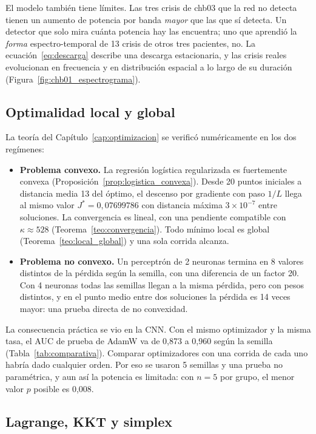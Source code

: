 El modelo también tiene límites. Las tres crisis de chb03 que la red no detecta tienen un aumento de potencia por banda
\emph{mayor} que las que sí detecta. Un detector que solo mira cuánta potencia hay las encuentra; uno que aprendió la
\emph{forma} espectro-temporal de 13 crisis de otros tres pacientes, no. La ecuación~\eqref{eq:descarga} describe una
descarga estacionaria, y las crisis reales evolucionan en frecuencia y en distribución espacial a lo largo de su duración
(Figura~\ref{fig:chb01_espectrograma}).

\subsection{Optimalidad local y global}

La teoría del Capítulo~\ref{cap:optimizacion} se verificó numéricamente en los dos regímenes:
\begin{itemize}
  \item \textbf{Problema convexo.} La regresión logística regularizada es fuertemente convexa
        (Proposición~\ref{prop:logistica_convexa}). Desde 20 puntos iniciales a distancia media 13 del óptimo, el descenso por
        gradiente con paso $1/L$ llega al mismo valor $J^* = 0{,}07699786$ con distancia máxima $3\times10^{-7}$ entre
        soluciones. La convergencia es lineal, con una pendiente compatible con $\kappa \approx 528$
        (Teorema~\ref{teo:convergencia}). Todo mínimo local es global (Teorema~\ref{teo:local_global}) y una sola corrida
        alcanza.
  \item \textbf{Problema no convexo.} Un perceptrón de 2 neuronas termina en 8 valores distintos de la pérdida según la
        semilla, con una diferencia de un factor 20. Con 4 neuronas todas las semillas llegan a la misma pérdida, pero con
        pesos distintos, y en el punto medio entre dos soluciones la pérdida es 14 veces mayor: una prueba directa de no
        convexidad.
\end{itemize}

La consecuencia práctica se vio en la CNN. Con el mismo optimizador y la misma tasa, el AUC de prueba de AdamW va de 0,873
a 0,960 según la semilla (Tabla~\ref{tab:comparativa}). Comparar optimizadores con una corrida de cada uno habría dado
cualquier orden. Por eso se usaron 5 semillas y una prueba no paramétrica, y aun así la potencia es limitada: con $n = 5$
por grupo, el menor valor $p$ posible es 0,008.

\subsection{Lagrange, KKT y simplex}

